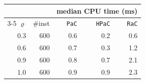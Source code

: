 \begin{tabular}{@{}rrrrr@{}}
\toprule
 &  & \multicolumn{3}{c}{median CPU time (ms)} \\
\cmidrule(l){3-5}
$\varrho$ & \#inst & \texttt{PaC} & \texttt{HPaC} & \texttt{RaC} \\
\midrule
0.3 & 600 & 0.6 & 0.2 & 0.6 \\
0.6 & 600 & 0.7 & 0.3 & 1.2 \\
0.9 & 600 & 0.8 & 0.7 & 2.1 \\
1.0 & 600 & 0.9 & 0.9 & 2.3 \\
\bottomrule
\end{tabular}
